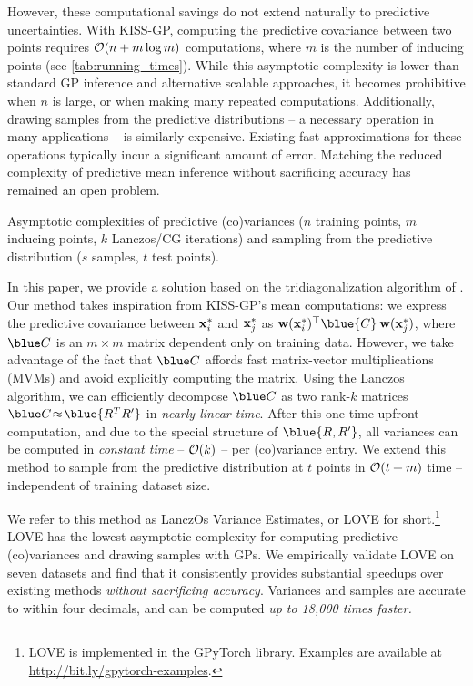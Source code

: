 However, these computational savings do not extend naturally to predictive uncertainties.
With KISS-GP, computing the predictive covariance between two points requires $\bigo{n + m \log m}$ computations, where $m$ is the number of inducing points (see \autoref{tab:running_times}).
While this asymptotic complexity is lower than standard GP inference and alternative scalable approaches, it becomes prohibitive when $n$ is large, or when making many repeated computations.
Additionally, drawing samples from the predictive distributions -- a necessary operation in many applications -- is similarly expensive.
Existing fast approximations for these operations \cite{papandreou2011efficient,wilson2015thoughts,wang2017max} typically incur a significant amount of error.
Matching the reduced complexity of predictive mean inference without sacrificing accuracy has remained an open problem.

\begin{table}[t!]
  \caption{
    Asymptotic complexities of predictive (co)variances ($n$ training points, $m$ inducing points, $k$ Lanczos/CG iterations)
    and sampling from the predictive distribution ($s$ samples, $t$ test points).
    \label{tab:running_times}
  }
  \vspace{0.5ex}
  \centering
  \resizebox{\textwidth}{!}{%
    
  }
  \vspace{-2ex}
\end{table}


In this paper, we provide a solution based on the tridiagonalization algorithm of \citet{lanczos1950iteration}.
Our method takes inspiration from KISS-GP's mean computations: we express the predictive covariance between $\mathbf{x}^*_i$ and $\mathbf{x}^{*}_j$ as
$\bw(\bx^*_i)^\top \blue{C} \: \bw(\bx^{*}_j)$,
where $\blue C$ is an $m \times m$ matrix dependent only on training data.
However, we take advantage of the fact that $\blue C$ affords fast matrix-vector multiplications (MVMs) and avoid explicitly computing the matrix.
Using the Lanczos algorithm, we can efficiently decompose $\blue C$ as two rank-$k$ matrices $\blue C\!\approx\! \blue{R^T R^\prime}$ in \emph{nearly linear time}.
After this one-time upfront computation, and due to the special structure of $\blue {R,R^\prime}$, all variances can be computed in \emph{constant time} -- $\bigo{k}$ -- per (co)variance entry.
We extend this method to sample from the predictive distribution at $t$ points in $\bigo{t + m}$ time -- independent of training dataset size.

We refer to this method as LanczOs Variance Estimates, or LOVE{} for short.\footnote{
  LOVE{} is implemented in the GPyTorch library.
  Examples are available at \url{http://bit.ly/gpytorch-examples}.
}
LOVE{} has the lowest asymptotic complexity for computing predictive (co)variances and drawing samples with GPs.
We empirically validate LOVE{} on seven datasets and find that it consistently provides substantial speedups over existing methods \emph{without sacrificing accuracy}.
Variances and samples are accurate to within four decimals, and can be computed \emph{up to 18,000 times faster.}
